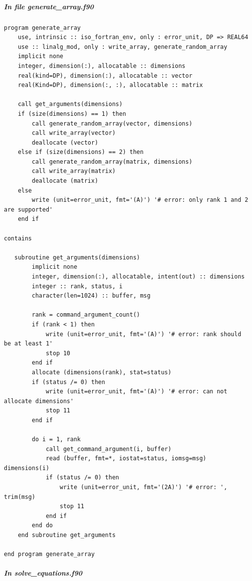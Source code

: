 \subparagraph{In file generate\_array.f90}

\begin{verbatim}
program generate_array
    use, intrinsic :: iso_fortran_env, only : error_unit, DP => REAL64
    use :: linalg_mod, only : write_array, generate_random_array
    implicit none
    integer, dimension(:), allocatable :: dimensions
    real(kind=DP), dimension(:), allocatable :: vector
    real(Kind=DP), dimension(:, :), allocatable :: matrix

    call get_arguments(dimensions)
    if (size(dimensions) == 1) then
        call generate_random_array(vector, dimensions)
        call write_array(vector)
        deallocate (vector)
    else if (size(dimensions) == 2) then
        call generate_random_array(matrix, dimensions)
        call write_array(matrix)
        deallocate (matrix)
    else
        write (unit=error_unit, fmt='(A)') '# error: only rank 1 and 2 are supported'
    end if

contains

   subroutine get_arguments(dimensions)
        implicit none
        integer, dimension(:), allocatable, intent(out) :: dimensions
        integer :: rank, status, i
        character(len=1024) :: buffer, msg
        
        rank = command_argument_count()
        if (rank < 1) then
            write (unit=error_unit, fmt='(A)') '# error: rank should be at least 1'
            stop 10
        end if
        allocate (dimensions(rank), stat=status)
        if (status /= 0) then
            write (unit=error_unit, fmt='(A)') '# error: can not allocate dimensions'
            stop 11
        end if

        do i = 1, rank
            call get_command_argument(i, buffer)
            read (buffer, fmt=*, iostat=status, iomsg=msg) dimensions(i)
            if (status /= 0) then
                write (unit=error_unit, fmt='(2A)') '# error: ', trim(msg)
                stop 11
            end if
        end do
    end subroutine get_arguments

end program generate_array
\end{verbatim}

\subparagraph{In solve\_equations.f90}

